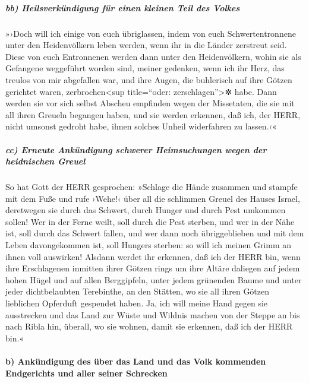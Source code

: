 \hypertarget{bb-heilsverkuxfcndigung-fuxfcr-einen-kleinen-teil-des-volkes}{%
\subparagraph{bb) Heilsverkündigung für einen kleinen Teil des
Volkes}\label{bb-heilsverkuxfcndigung-fuxfcr-einen-kleinen-teil-des-volkes}}

»›Doch will ich einige von euch übriglassen, indem von
euch Schwertentronnene unter den Heidenvölkern leben werden, wenn ihr in
die Länder zerstreut seid. Diese von euch Entronnenen
werden dann unter den Heidenvölkern, wohin sie als Gefangene weggeführt
worden sind, meiner gedenken, wenn ich ihr Herz, das treulos von mir
abgefallen war, und ihre Augen, die buhlerisch auf ihre Götzen gerichtet
waren, zerbrochen\textless sup title=``oder: zerschlagen''\textgreater✲
habe. Dann werden sie vor sich selbst Abscheu empfinden wegen der
Missetaten, die sie mit all ihren Greueln begangen haben,
und sie werden erkennen, daß ich, der HERR, nicht umsonst
gedroht habe, ihnen solches Unheil widerfahren zu lassen.‹«

\hypertarget{cc-erneute-ankuxfcndigung-schwerer-heimsuchungen-wegen-der-heidnischen-greuel}{%
\subparagraph{cc) Erneute Ankündigung schwerer Heimsuchungen wegen der
heidnischen
Greuel}\label{cc-erneute-ankuxfcndigung-schwerer-heimsuchungen-wegen-der-heidnischen-greuel}}

So hat Gott der HERR gesprochen: »Schlage die Hände
zusammen und stampfe mit dem Fuße und rufe ›Wehe!‹ über all die
schlimmen Greuel des Hauses Israel, deretwegen sie durch das Schwert,
durch Hunger und durch Pest umkommen sollen! Wer in der
Ferne weilt, soll durch die Pest sterben, und wer in der Nähe ist, soll
durch das Schwert fallen, und wer dann noch übriggeblieben und mit dem
Leben davongekommen ist, soll Hungers sterben: so will ich meinen Grimm
an ihnen voll auswirken! Alsdann werdet ihr erkennen, daß
ich der HERR bin, wenn ihre Erschlagenen inmitten ihrer Götzen rings um
ihre Altäre daliegen auf jedem hohen Hügel und auf allen Berggipfeln,
unter jedem grünenden Baume und unter jeder dichtbelaubten Terebinthe,
an den Stätten, wo sie all ihren Götzen lieblichen Opferduft gespendet
haben. Ja, ich will meine Hand gegen sie ausstrecken und
das Land zur Wüste und Wildnis machen von der Steppe an bis nach Ribla
hin, überall, wo sie wohnen, damit sie erkennen, daß ich der HERR bin.«

\hypertarget{b-ankuxfcndigung-des-uxfcber-das-land-und-das-volk-kommenden-endgerichts-und-aller-seiner-schrecken}{%
\paragraph{b) Ankündigung des über das Land und das Volk kommenden
Endgerichts und aller seiner
Schrecken}\label{b-ankuxfcndigung-des-uxfcber-das-land-und-das-volk-kommenden-endgerichts-und-aller-seiner-schrecken}}

